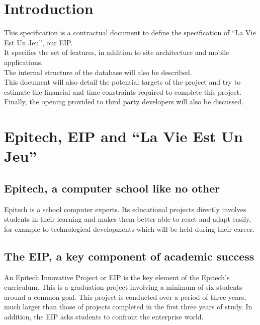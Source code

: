 \documentclass {life-en}
\begin{document}
\listofrevisions

\newpage

\tableofcontents



\chapter{Introduction}

This specification is a contractual document to define the
specification of ``La Vie Est Un Jeu'', our EIP. \\
It specifies the set of features, in addition to site architecture and
mobile applications.\\
The internal structure of the database will also be described.\\
This document will also detail the potential targets of the project and try to 
estimate the financial and time constraints required to complete this project.\\
Finally, the opening provided to third party developers will also be discussed.



\chapter{Epitech, EIP and ``La Vie Est Un Jeu''}

\section{Epitech, a computer school like no other}

Epitech is a school computer experts. Its educational projects
directly involves students in their learning and makes them better able
to react and adapt easily, for example to technological developments which
will be held during their career.

\section{The EIP, a key component of academic success}

An Epitech Innovative Project or EIP is the key element of the Epitech's curriculum. This is a graduation project involving a minimum of six students around a common goal. This project is conducted over a period of three years, much larger than those of projects completed in the first three years of study. In addition, the EIP asks students to confront the enterprise world.
\end{document}
